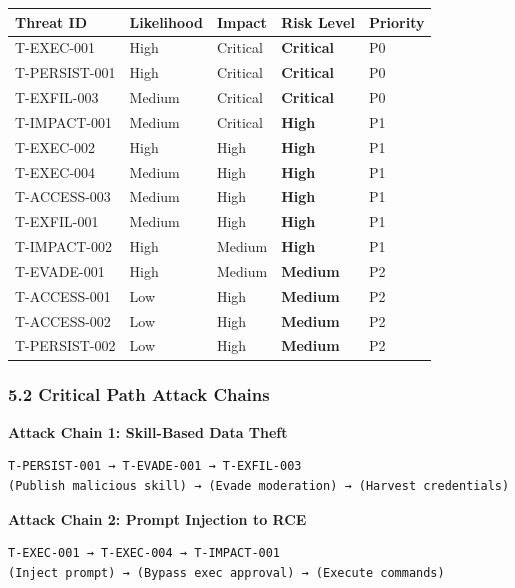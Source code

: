 \begin{table}[h]
\centering
\small
\begin{tabular}{|l|l|l|l|l|}
\hline
Threat ID & Likelihood & Impact & Risk Level & Priority \\
\hline
T-EXEC-001 & High & Critical & \textbf{Critical} & P0 \\
\hline
T-PERSIST-001 & High & Critical & \textbf{Critical} & P0 \\
\hline
T-EXFIL-003 & Medium & Critical & \textbf{Critical} & P0 \\
\hline
T-IMPACT-001 & Medium & Critical & \textbf{High} & P1 \\
\hline
T-EXEC-002 & High & High & \textbf{High} & P1 \\
\hline
T-EXEC-004 & Medium & High & \textbf{High} & P1 \\
\hline
T-ACCESS-003 & Medium & High & \textbf{High} & P1 \\
\hline
T-EXFIL-001 & Medium & High & \textbf{High} & P1 \\
\hline
T-IMPACT-002 & High & Medium & \textbf{High} & P1 \\
\hline
T-EVADE-001 & High & Medium & \textbf{Medium} & P2 \\
\hline
T-ACCESS-001 & Low & High & \textbf{Medium} & P2 \\
\hline
T-ACCESS-002 & Low & High & \textbf{Medium} & P2 \\
\hline
T-PERSIST-002 & Low & High & \textbf{Medium} & P2 \\
\hline
\end{tabular}
\end{table}



\subsubsection{5.2 Critical Path Attack Chains}


\textbf{Attack Chain 1: Skill-Based Data Theft}

\begin{lstlisting}
T-PERSIST-001 → T-EVADE-001 → T-EXFIL-003
(Publish malicious skill) → (Evade moderation) → (Harvest credentials)
\end{lstlisting}


\textbf{Attack Chain 2: Prompt Injection to RCE}

\begin{lstlisting}
T-EXEC-001 → T-EXEC-004 → T-IMPACT-001
(Inject prompt) → (Bypass exec approval) → (Execute commands)
\end{lstlisting}


